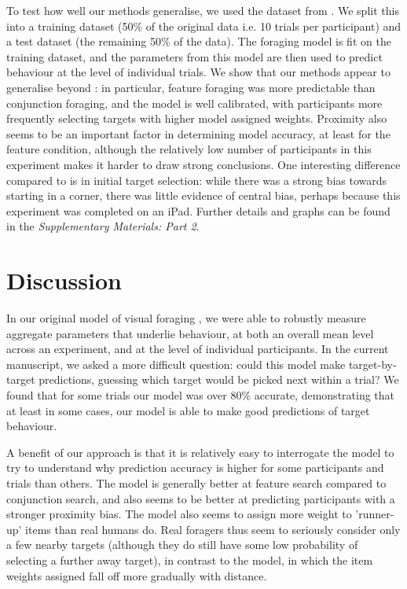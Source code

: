 \documentclass[preprints, article,submit,pdftex,moreauthors]{Definitions/mdpi}
\begin{document}
To test how well our methods generalise, we used the dataset from \citep{kristjansson2014}. We split this into a training dataset (50\% of the original data i.e. 10 trials per participant) and a test dataset (the remaining 50\% of the data). The foraging model is fit on the training dataset, and the parameters from this model are then used to predict behaviour at the level of individual trials. We show that our methods appear to generalise beyond \citep{clarke2022}: in particular, feature foraging was more predictable than conjunction foraging, and the model is well calibrated, with participants more frequently selecting targets with higher model assigned weights. Proximity also seems to be an important factor in determining model accuracy, at least for the feature condition, although the relatively low number of participants in this experiment makes it harder to draw strong conclusions. One interesting difference compared to \citep{clarke2022} is in initial target selection: while there was a strong bias towards starting in a corner, there was little evidence of central bias, perhaps because this experiment was completed on an iPad. Further details and graphs can be found in the \textit{Supplementary Materials: Part 2}.

\section{Discussion}

In our original model of visual foraging \citep{clarke2022foraging}, we were able to robustly measure aggregate parameters that underlie behaviour, at both an overall mean level across an experiment, and at the level of individual participants. In the current manuscript, we asked a more difficult question: could this model make target-by-target predictions, guessing which target would be picked next within a trial? We found that for some trials our model was over 80\% accurate, demonstrating that at least in some cases, our model is able to make good predictions of target behaviour.

A benefit of our approach is that it is relatively easy to interrogate the model to try to understand why prediction accuracy is higher for some participants and trials than others. The model is generally better at feature search compared to conjunction search, and also seems to be better at predicting participants with a stronger proximity bias. The model also seems to assign more weight to 'runner-up' items than real humans do. Real foragers thus seem to seriously consider only a few nearby targets (although they do still have some low probability of selecting a further away target), in contrast to the model, in which the item weights assigned fall off more gradually with distance.
\end{document}
